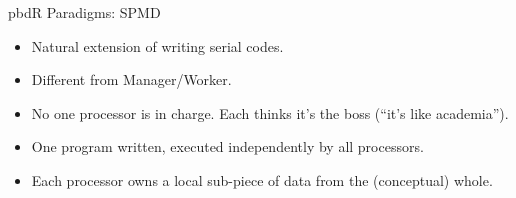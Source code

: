 \begin{frame}
  \begin{block}{pbdR Paradigms:  SPMD}
  \begin{itemize}[<+-|alert@+>]
   \item Natural extension of writing serial codes.
   \item Different from Manager/Worker.
   \item No one processor is in charge. Each thinks it's the boss (``it's like academia'').
   \item One program written, executed independently by all processors.
   \item Each processor owns a local sub-piece of data from the (conceptual) whole.
  \end{itemize}
  \end{block}
\end{frame}

% 
